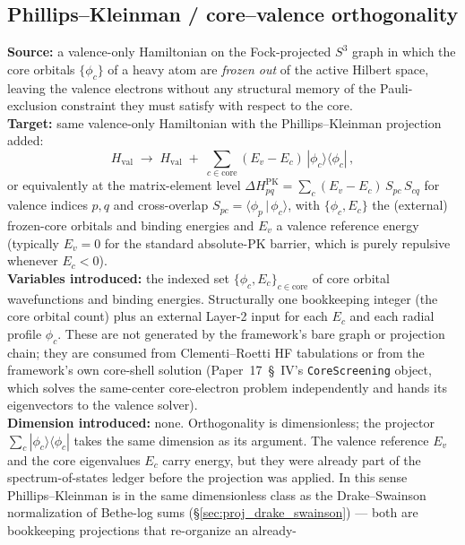 \documentclass[11pt]{article}
\begin{document}
\subsection{Phillips--Kleinman / core--valence orthogonality}
\label{sec:proj_phillips_kleinman}
\textbf{Source:} a valence-only Hamiltonian on the Fock-projected $S^3$
graph in which the core orbitals $\{\phi_c\}$ of a heavy atom are
\emph{frozen out} of the active Hilbert space, leaving the valence
electrons without any structural memory of the Pauli-exclusion
constraint they must satisfy with respect to the core.\\
\textbf{Target:} same valence-only Hamiltonian with the Phillips--Kleinman
projection added:
\begin{equation*}
  H_\text{val} \;\longrightarrow\; H_\text{val}
  \;+\; \sum_{c \in \text{core}} (E_v - E_c)\,
  |\phi_c\rangle\langle\phi_c|\,,
\end{equation*}
or equivalently at the matrix-element level
$\Delta H_{pq}^\text{PK} = \sum_c (E_v - E_c)\,S_{pc}\,S_{cq}$ for
valence indices $p,q$ and cross-overlap $S_{pc} = \langle\phi_p\,
|\,\phi_c\rangle$, with $\{\phi_c, E_c\}$ the (external) frozen-core
orbitals and binding energies and $E_v$ a valence reference energy
(typically $E_v = 0$ for the standard absolute-PK barrier, which is
purely repulsive whenever $E_c < 0$).\\
\textbf{Variables introduced:} the indexed set
$\{\phi_c, E_c\}_{c \in \text{core}}$ of core orbital wavefunctions
and binding energies.  Structurally one bookkeeping integer (the
core orbital count) plus an external Layer-2 input for each $E_c$ and
each radial profile $\phi_c$.  These are not generated by the
framework's bare graph or projection chain; they are consumed from
Clementi--Roetti HF tabulations or from the framework's own core-shell
solution (Paper~17~\S~IV's \texttt{CoreScreening} object,
which solves the same-center core-electron problem independently and
hands its eigenvectors to the valence solver).\\
\textbf{Dimension introduced:} none.  Orthogonality is dimensionless;
the projector $\sum_c |\phi_c\rangle\langle\phi_c|$ takes the same
dimension as its argument.  The valence reference $E_v$ and the
core eigenvalues $E_c$ carry energy, but they were already part of the
spectrum-of-states ledger before the projection was applied.  In this
sense Phillips--Kleinman is in the same dimensionless class as
the Drake--Swainson normalization of Bethe-log sums
(\S\ref{sec:proj_drake_swainson}) --- both are bookkeeping projections that re-organize an already-
\end{document}

